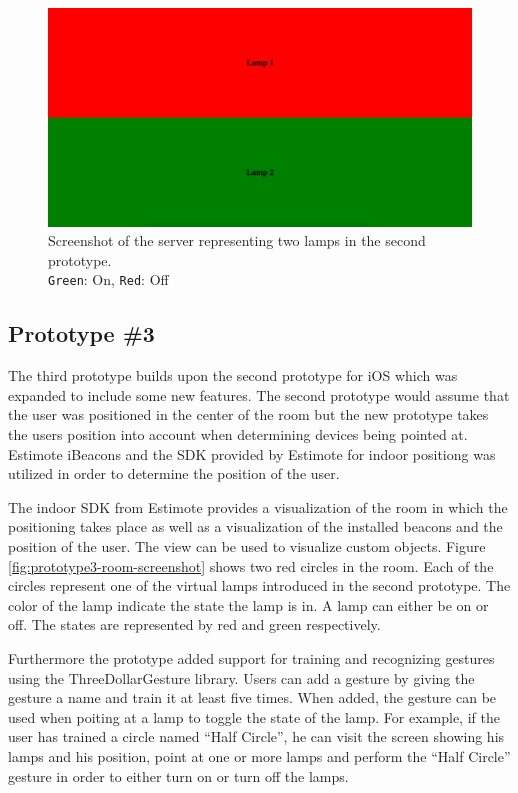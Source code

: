 \begin{figure}[!htb]
    \centering
    \includegraphics[scale=0.2]{images/Prototype2_Server.png}
    \caption[caption]{Screenshot of the server representing two lamps in the second prototype.\\\texttt{Green}: On, \texttt{Red}: Off}
    \label{fig:prototype2-server-screenshot}
\end{figure}

\subsection{Prototype \#3}
\label{sec:implementation:prototypes:prototype3}

The third prototype builds upon the second prototype for iOS which was expanded to include some new features. The second prototype would assume that the user was positioned in the center of the room but the new prototype takes the users position into account when determining devices being pointed at. Estimote iBeacons and the SDK provided by Estimote for indoor positiong was utilized in order to determine the position of the user.

The indoor SDK from Estimote provides a visualization of the room in which the positioning takes place as well as a visualization of the installed beacons and the position of the user. The view can be used to visualize custom objects. Figure \ref{fig:prototype3-room-screenshot} shows two red circles in the room. Each of the circles represent one of the virtual lamps introduced in the second prototype. The color of the lamp indicate the state the lamp is in. A lamp can either be on or off. The states are represented by red and green respectively.

Furthermore the prototype added support for training and recognizing gestures using the ThreeDollarGesture library. Users can add a gesture by giving the gesture a name and train it at least five times. When added, the gesture can be used when poiting at a lamp to toggle the state of the lamp. For example, if the user has trained a circle named ``Half Circle'', he can visit the screen showing his lamps and his position, point at one or more lamps and perform the ``Half Circle'' gesture in order to either turn on or turn off the lamps.

